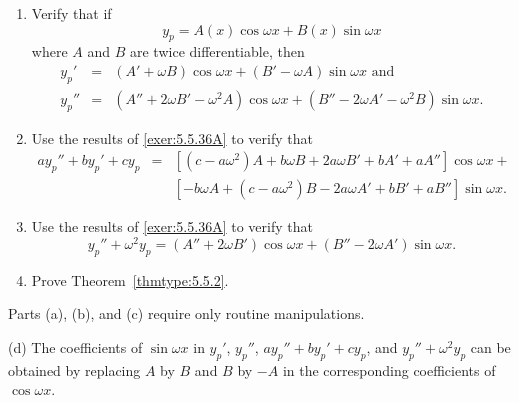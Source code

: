 \documentclass{ximera}
\begin{document}
\begin{problem}\label{exer:5.5.36}
\begin{enumerate}
\item\label{exer:5.5.36A} %
Verify that if
$$
y_p=A(x)\cos\omega x+B(x)\sin\omega x
$$
where $A$ and $B$ are twice differentiable, then
\begin{eqnarray*}
 y_p'&=&(A'+\omega B)\cos\omega x+(B'-\omega A)
\sin\omega x \text{ and}\\
 y_p''&=&(A''+2\omega B'-\omega^2A)\cos\omega x
+(B''-2\omega A'-\omega^2B)\sin\omega x.
\end{eqnarray*}
\item\label{exer:5.5.36B} %
Use the results of \ref{exer:5.5.36A} to verify that
\begin{eqnarray*}
ay_p''+by_p'+cy_p&=&\left[(c-a\omega^2)A+b\omega B+2a\omega
B'+bA'+aA''\right] \cos\omega x+\\  &&
\left[-b\omega A+(c-a\omega^2)B-2a\omega A'+bB'+aB''\right]\sin\omega
x.
\end{eqnarray*}
\item\label{exer:5.5.36C} %
Use the results of \ref{exer:5.5.36A} to verify that
$$
y_p''+\omega^2 y_p=(A''+2\omega B')\cos\omega x+
(B''-2\omega A')\sin\omega x.
$$
\item %
Prove Theorem~\ref{thmtype:5.5.2}.
\end{enumerate}

\begin{solution}
    Parts (a), (b), and (c) require only routine
manipulations.

(d) The coefficients of $\sin\omega x$ in
$y_p'$, $y_p''$, $ay_p''+by_p'+cy_p$,
and $y_p''+\omega^2 y_p$  can be obtained by replacing $A$ by $B$
and $B$ by $-A$ in the corresponding coefficients of $\cos\omega x$.
\end{solution}
\end{problem}
\end{document}
